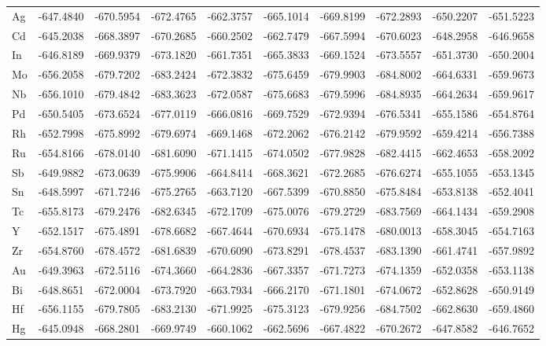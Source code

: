 \documentclass[a4paper, 12pt]{article}
\begin{document}
\begin{table}[htbp]
{\begin{tabular}{l *{9}{c}}
      Ag & -647.4840 & -670.5954 & -672.4765 & -662.3757 & -665.1014 & -669.8199 & -672.2893 & -650.2207 & -651.5223 \\
      Cd & -645.2038 & -668.3897 & -670.2685 & -660.2502 & -662.7479 & -667.5994 & -670.6023 & -648.2958 & -646.9658 \\
      In & -646.8189 & -669.9379 & -673.1820 & -661.7351 & -665.3833 & -669.1524 & -673.5557 & -651.3730 & -650.2004 \\
      Mo & -656.2058 & -679.7202 & -683.2424 & -672.3832 & -675.6459 & -679.9903 & -684.8002 & -664.6331 & -659.9673 \\
      Nb & -656.1010 & -679.4842 & -683.3623 & -672.0587 & -675.6683 & -679.5996 & -684.8935 & -664.2634 & -659.9617 \\
      Pd & -650.5405 & -673.6524 & -677.0119 & -666.0816 & -669.7529 & -672.9394 & -676.5341 & -655.1586 & -654.8764 \\
      Rh & -652.7998 & -675.8992 & -679.6974 & -669.1468 & -672.2062 & -676.2142 & -679.9592 & -659.4214 & -656.7388 \\
      Ru & -654.8166 & -678.0140 & -681.6090 & -671.1415 & -674.0502 & -677.9828 & -682.4415 & -662.4653 & -658.2092 \\
      Sb & -649.9882 & -673.0639 & -675.9906 & -664.8414 & -668.3621 & -672.2685 & -676.6274 & -655.1055 & -653.1345 \\
      Sn & -648.5997 & -671.7246 & -675.2765 & -663.7120 & -667.5399 & -670.8850 & -675.8484 & -653.8138 & -652.4041 \\
      Tc & -655.8173 & -679.2476 & -682.6345 & -672.1709 & -675.0076 & -679.2729 & -683.7569 & -664.1434 & -659.2908 \\
      Y  & -652.1517 & -675.4891 & -678.6682 & -667.4644 & -670.6934 & -675.1478 & -680.0013 & -658.3045 & -654.7163 \\
      Zr & -654.8760 & -678.4572 & -681.6839 & -670.6090 & -673.8291 & -678.4537 & -683.1390 & -661.4741 & -657.9892 \\
      Au & -649.3963 & -672.5116 & -674.3660 & -664.2836 & -667.3357 & -671.7273 & -674.1359 & -652.0358 & -653.1138 \\
      Bi & -648.8651 & -672.0004 & -673.7920 & -663.7934 & -666.2170 & -671.1801 & -674.0672 & -652.8628 & -650.9149 \\
      Hf & -656.1155 & -679.7805 & -683.2130 & -671.9925 & -675.3123 & -679.9256 & -684.7502 & -662.8630 & -659.4860 \\
      Hg & -645.0948 & -668.2801 & -669.9749 & -660.1062 & -662.5696 & -667.4822 & -670.2672 & -647.8582 & -646.7652 \\

\end{tabular}}
\end{table}
\end{document}
